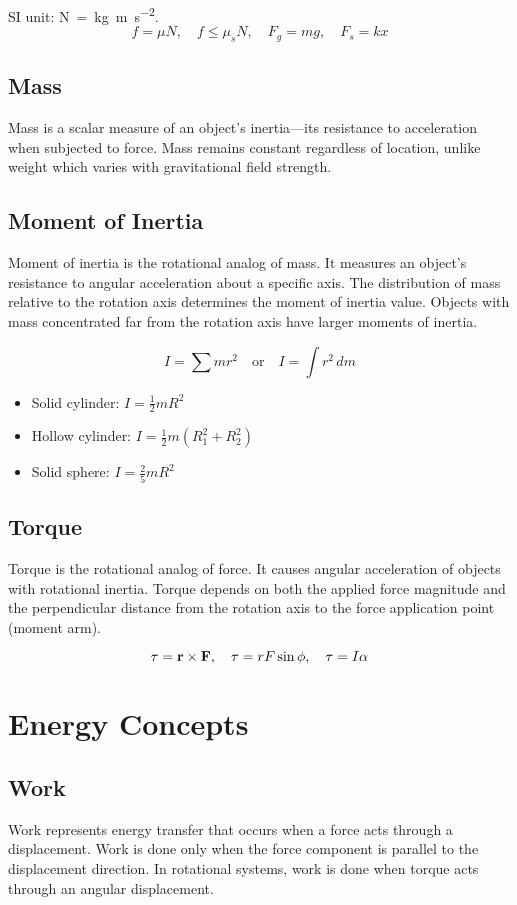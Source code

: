 \documentclass[11pt,a4paper]{article}
\begin{document}
SI unit: \si{N = kg.m.s^{-2}}.
\[
f = \mu N, \quad f \leq \mu_s N, \quad F_g = mg, \quad F_s = kx
\]

\subsection*{Mass}
Mass is a scalar measure of an object's inertia—its resistance to acceleration when subjected to force. Mass remains constant regardless of location, unlike weight which varies with gravitational field strength.

\subsection*{Moment of Inertia}
Moment of inertia is the rotational analog of mass. It measures an object's resistance to angular acceleration about a specific axis. The distribution of mass relative to the rotation axis determines the moment of inertia value. Objects with mass concentrated far from the rotation axis have larger moments of inertia.

\[
I = \sum m r^2 \quad\text{or}\quad I = \int r^2 \, dm
\]
\begin{itemize}
\item Solid cylinder: $I = \tfrac12 mR^2$
\item Hollow cylinder: $I = \tfrac12 m(R_1^2+R_2^2)$
\item Solid sphere: $I = \tfrac25 mR^2$
\end{itemize}

\subsection*{Torque}
Torque is the rotational analog of force. It causes angular acceleration of objects with rotational inertia. Torque depends on both the applied force magnitude and the perpendicular distance from the rotation axis to the force application point (moment arm).

\[
\vb{\tau} = \vb{r} \times \vb{F}, \quad \tau = rF \sin\phi, \quad
\tau = I\alpha
\]

\section{Energy Concepts}

\subsection*{Work}
Work represents energy transfer that occurs when a force acts through a displacement. Work is done only when the force component is parallel to the displacement direction. In rotational systems, work is done when torque acts through an angular displacement.
\end{document}
